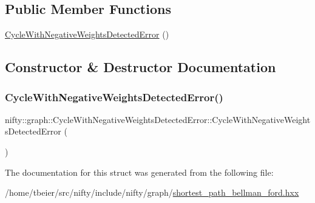 \subsection*{Public Member Functions}
\begin{DoxyCompactItemize}
\item 
\hyperlink{structnifty_1_1graph_1_1CycleWithNegativeWeightsDetectedError_a0242d14469b080eac45e9c926a58e9f4}{Cycle\+With\+Negative\+Weights\+Detected\+Error} ()
\end{DoxyCompactItemize}


\subsection{Constructor \& Destructor Documentation}
\mbox{\label{structnifty_1_1graph_1_1CycleWithNegativeWeightsDetectedError_a0242d14469b080eac45e9c926a58e9f4}} 
\subsubsection{\texorpdfstring{Cycle\+With\+Negative\+Weights\+Detected\+Error()}{CycleWithNegativeWeightsDetectedError()}}
{\footnotesize\ttfamily nifty\+::graph\+::\+Cycle\+With\+Negative\+Weights\+Detected\+Error\+::\+Cycle\+With\+Negative\+Weights\+Detected\+Error (\begin{DoxyParamCaption}{ }\end{DoxyParamCaption})\hspace{0.3cm}{\ttfamily [inline]}}



The documentation for this struct was generated from the following file\+:\begin{DoxyCompactItemize}
\item 
/home/tbeier/src/nifty/include/nifty/graph/\hyperlink{shortest__path__bellman__ford_8hxx}{shortest\+\_\+path\+\_\+bellman\+\_\+ford.\+hxx}\end{DoxyCompactItemize}
